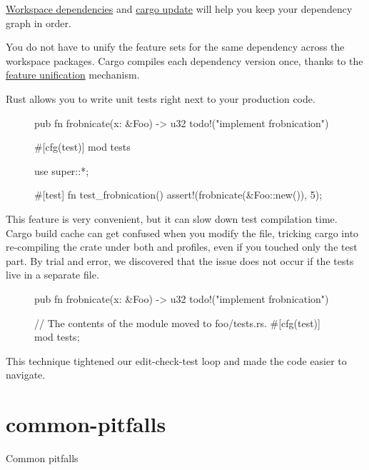 \documentclass{article}
\begin{document}
\href{https://doc.rust-lang.org/cargo/reference/workspaces.html#the-dependencies-table}{Workspace dependencies} and \href{https://doc.rust-lang.org/cargo/commands/cargo-update.html}{cargo update} will help you keep your dependency graph in order.

You do not have to unify the feature sets for the same dependency across the workspace packages.
Cargo compiles each dependency version once, thanks to the \href{https://doc.rust-lang.org/cargo/reference/features.html#feature-unification}{feature unification} mechanism.


Rust allows you to write unit tests right next to your production code.

\begin{figure}
\begin{code}[bad]
pub fn frobnicate(x: &Foo) -> u32 {
    todo!("implement frobnication")
}

#[cfg(test)]
mod tests {
    use super::*;

    #[test]
    fn test_frobnication() {
        assert!(frobnicate(&Foo::new()), 5);
    }
}
\end{code}
\end{figure}

This feature is very convenient, but it can slow down test compilation time.
Cargo build cache can get confused when you modify the file, tricking cargo into re-compiling the crate under both  and  profiles, even if you touched only the test part.
By trial and error, we discovered that the issue does not occur if the tests live in a separate file.

\begin{figure}
\begin{code}[good]
pub fn frobnicate(x: &Foo) -> u32 {
    todo!("implement frobnication")
}

// The contents of the module moved to foo/tests.rs.
#[cfg(test)]
mod tests;
\end{code}
\end{figure}

This technique tightened our edit-check-test loop and made the code easier to navigate.

\section{common-pitfalls}{Common pitfalls}
\end{document}
